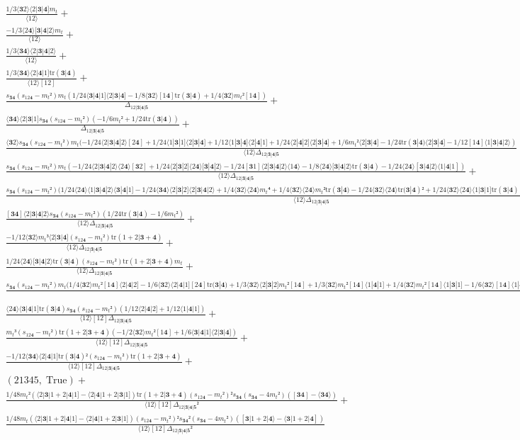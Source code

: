 \documentclass[varwidth, border=5pt]{standalone}
\newcommand{\tr}{\text{tr}}
\begin{document}
\begin{my}
$\begin{gathered}
\scriptscriptstyle\frac{1/3⟨𝟑2⟩⟨2|𝟑|𝟒]m_t}{⟨12⟩} +\\
\scriptscriptstyle\frac{-1/3⟨2𝟒⟩[𝟑|𝟒|2⟩m_t}{⟨12⟩} +\\
\scriptscriptstyle\frac{1/3⟨𝟑𝟒⟩⟨2|𝟑|𝟒|2⟩}{⟨12⟩} +\\
\scriptscriptstyle\frac{1/3⟨𝟑𝟒⟩⟨2|𝟒|1]\tr(𝟑|𝟒)}{⟨12⟩[12]} +\\
\scriptscriptstyle\frac{s_{𝟑𝟒}(s_{12𝟒}-m_t²)m_t(1/24⟨𝟑|𝟒|1]⟨2|𝟑|𝟒]-1/8⟨𝟑2⟩[1𝟒]\tr(𝟑|𝟒)+1/4⟨𝟑2⟩m_t²[1𝟒])}{Δ_{12|𝟑|𝟒|𝟓}} +\\
\scriptscriptstyle\frac{⟨𝟑𝟒⟩⟨2|𝟑|1]s_{𝟑𝟒}(s_{12𝟒}-m_t²)(-1/6m_t²+1/24\tr(𝟑|𝟒))}{Δ_{12|𝟑|𝟒|𝟓}} +\\
\scriptscriptstyle\frac{⟨𝟑2⟩s_{𝟑𝟒}(s_{12𝟒}-m_t²)m_t(-1/24⟨2|𝟑|𝟒|2⟩[2𝟒]+1/24⟨1|𝟑|1]⟨2|𝟑|𝟒]+1/12⟨1|𝟑|𝟒]⟨2|𝟒|1]+1/24⟨2|𝟒|2]⟨2|𝟑|𝟒]+1/6m_t²⟨2|𝟑|𝟒]-1/24\tr(𝟑|𝟒)⟨2|𝟑|𝟒]-1/12[1𝟒]⟨1|𝟑|𝟒|2⟩)}{⟨12⟩Δ_{12|𝟑|𝟒|𝟓}} +\\
\scriptscriptstyle\frac{s_{𝟑𝟒}(s_{12𝟒}-m_t²)m_t(-1/24⟨2|𝟑|𝟒|2⟩⟨2𝟒⟩[𝟑2]+1/24⟨2|𝟑|2]⟨2𝟒⟩[𝟑|𝟒|2⟩-1/24[𝟑1]⟨2|𝟑|𝟒|2⟩⟨1𝟒⟩-1/8⟨2𝟒⟩[𝟑|𝟒|2⟩\tr(𝟑|𝟒)-1/24⟨2𝟒⟩[𝟑|𝟒|2⟩⟨1|𝟒|1])}{⟨12⟩Δ_{12|𝟑|𝟒|𝟓}} +\\
\scriptscriptstyle\frac{s_{𝟑𝟒}(s_{12𝟒}-m_t²)(1/24⟨2𝟒⟩⟨1|𝟑|𝟒|2⟩⟨𝟑|𝟒|1]-1/24⟨𝟑𝟒⟩⟨2|𝟑|2]⟨2|𝟑|𝟒|2⟩+1/4⟨𝟑2⟩⟨2𝟒⟩m_t⁴+1/4⟨𝟑2⟩⟨2𝟒⟩m_t²\tr(𝟑|𝟒)-1/24⟨𝟑2⟩⟨2𝟒⟩\tr(𝟑|𝟒)²+1/24⟨𝟑2⟩⟨2𝟒⟩⟨1|𝟑|1]\tr(𝟑|𝟒)-1/24⟨𝟑2⟩⟨2𝟒⟩\tr(𝟑|𝟒)⟨2|𝟒|2])}{⟨12⟩Δ_{12|𝟑|𝟒|𝟓}} +\\
\scriptscriptstyle\frac{[𝟑𝟒]⟨2|𝟑|𝟒|2⟩s_{𝟑𝟒}(s_{12𝟒}-m_t²)(1/24\tr(𝟑|𝟒)-1/6m_t²)}{⟨12⟩Δ_{12|𝟑|𝟒|𝟓}} +\\
\scriptscriptstyle\frac{-1/12⟨𝟑2⟩m_t³⟨2|𝟑|𝟒](s_{12𝟒}-m_t²)\tr(1+2|𝟑+𝟒)}{⟨12⟩Δ_{12|𝟑|𝟒|𝟓}} +\\
\scriptscriptstyle\frac{1/24⟨2𝟒⟩[𝟑|𝟒|2⟩\tr(𝟑|𝟒)(s_{12𝟒}-m_t²)\tr(1+2|𝟑+𝟒)m_t}{⟨12⟩Δ_{12|𝟑|𝟒|𝟓}} +\\
\scriptscriptstyle\frac{s_{𝟑𝟒}(s_{12𝟒}-m_t²)m_t(1/4⟨𝟑2⟩m_t²[1𝟒]⟨2|𝟒|2]-1/6⟨𝟑2⟩⟨2|𝟒|1][2𝟒]\tr(𝟑|𝟒)+1/3⟨𝟑2⟩⟨2|𝟑|2]m_t²[1𝟒]+1/3⟨𝟑2⟩m_t²[1𝟒]⟨1|𝟒|1]+1/4⟨𝟑2⟩m_t²[1𝟒]⟨1|𝟑|1]-1/6⟨𝟑2⟩[1𝟒]⟨1|𝟒|1]\tr(𝟑|𝟒)-1/12⟨𝟑2⟩[1𝟒]⟨1|𝟑|1]\tr(𝟑|𝟒)-1/12⟨𝟑2⟩⟨2|𝟑|2][1𝟒]\tr(𝟑|𝟒)-1/12⟨𝟑|𝟒|2]⟨2|𝟑|𝟒|2⟩[1𝟒]-1/12⟨1|𝟑|𝟒]⟨2|𝟒|1]⟨𝟑|𝟒|1]-1/12⟨𝟑2⟩⟨1|𝟑|𝟒][1|𝟑|𝟒|1]-1/12⟨2|𝟑|2]⟨𝟑|𝟒|1]⟨2|𝟑|𝟒])}{⟨12⟩[12]Δ_{12|𝟑|𝟒|𝟓}} +\\
\scriptscriptstyle\frac{⟨2𝟒⟩⟨𝟑|𝟒|1]\tr(𝟑|𝟒)s_{𝟑𝟒}(s_{12𝟒}-m_t²)(1/12⟨2|𝟒|2]+1/12⟨1|𝟒|1])}{⟨12⟩[12]Δ_{12|𝟑|𝟒|𝟓}} +\\
\scriptscriptstyle\frac{m_t³(s_{12𝟒}-m_t²)\tr(1+2|𝟑+𝟒)(-1/2⟨𝟑2⟩m_t²[1𝟒]+1/6⟨𝟑|𝟒|1]⟨2|𝟑|𝟒])}{⟨12⟩[12]Δ_{12|𝟑|𝟒|𝟓}} +\\
\scriptscriptstyle\frac{-1/12⟨𝟑𝟒⟩⟨2|𝟒|1]\tr(𝟑|𝟒)²(s_{12𝟒}-m_t²)\tr(1+2|𝟑+𝟒)}{⟨12⟩[12]Δ_{12|𝟑|𝟒|𝟓}} +\\
\scriptscriptstyle(21345,\;\text{True}) +\\
\scriptscriptstyle\frac{1/48m_t²(⟨2|𝟑|1+2|𝟒|1]-⟨2|𝟒|1+2|𝟑|1])\tr(1+2|𝟑+𝟒)(s_{12𝟒}-m_t²)²s_{𝟑𝟒}(s_{𝟑𝟒}-4m_t²)([𝟑𝟒]-⟨𝟑𝟒⟩)}{⟨12⟩[12]Δ_{12|𝟑|𝟒|𝟓}²} +\\
\scriptscriptstyle\frac{1/48m_t(⟨2|𝟑|1+2|𝟒|1]-⟨2|𝟒|1+2|𝟑|1])(s_{12𝟒}-m_t²)²s_{𝟑𝟒}²(s_{𝟑𝟒}-4m_t²)([𝟑|1+2|𝟒⟩-⟨𝟑|1+2|𝟒])}{⟨12⟩[12]Δ_{12|𝟑|𝟒|𝟓}²} \phantom{+}
\end{gathered}$
\end{my}
\end{document}
